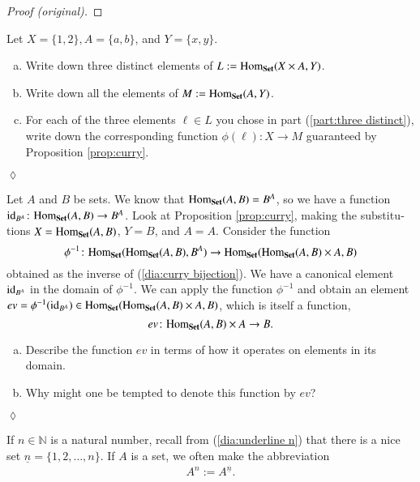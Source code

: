 \documentclass{book}
\def\tn{\textnormal}
\def\NN{{\mathbb N}}
\def\Hom{\tn{Hom}}
\def\to{\rightarrow}
\def\taking{\colon}
\def\m1{{-1}}
\def\ul{\underline}
\def\id{\tn{id}}
\def\Set{{\bf Set}}
\theoremstyle{theoremENG}
\theoremstyle{lemmaENG}
\theoremstyle{propositionENG}
\theoremstyle{corollaryENG}
\theoremstyle{factENG}
\theoremstyle{remarkENG}
\theoremstyle{exampleENG}
\theoremstyle{warningENG}
\theoremstyle{questionENG}
\theoremstyle{guessENG}
\theoremstyle{answerENG}
\theoremstyle{constructionENG}
\theoremstyle{rulesENG}
\theoremstyle{excENG}
\newtheorem{excENG}[subsubsection]{\begin{english}Exercise\end{english}}
\theoremstyle{appENG}
\theoremstyle{definitionENG}
\theoremstyle{notationENG}
\theoremstyle{conjectureENG}
\theoremstyle{postulateENG}
\newenvironment{proofENG}{\begin{proof}[Proof (original)]}{\end{proof}}
\newenvironment{exerciseENG}{\begin{excENG}}{\hspace*{\fill}$\lozenge$\end{excENG}}
\theoremstyle{theoremRUS}
\theoremstyle{lemmaRUS}
\theoremstyle{propositionRUS}
\theoremstyle{corollaryRUS}
\theoremstyle{factRUS}
\theoremstyle{remarkRUS}
\theoremstyle{exampleRUS}
\theoremstyle{warningRUS}
\theoremstyle{questionRUS}
\theoremstyle{guessRUS}
\theoremstyle{answerRUS}
\theoremstyle{constructionRUS}
\theoremstyle{rulesRUS}
\theoremstyle{excRUS}
\theoremstyle{appRUS}
\theoremstyle{definitionRUS}
\theoremstyle{notationRUS}
\theoremstyle{conjectureRUS}
\theoremstyle{postulateRUS}
\def\sexc{\begin{enumerate}[a.)]\setlength{\itemsep}{.1cm}\setlength{\parskip}{.1cm}\item}
\def\next{\item}
\def\endsexc{\end{enumerate}}
\begin{document}
\begin{english}
\begin{proofENG}
\end{proofENG}

\begin{exerciseENG}

Let $X=\{1,2\}, A=\{a,b\}$, and $Y=\{x,y\}$. 
\sexc\label{part:three distinct} Write down three distinct elements of $L:=\Hom_\Set(X\times A,Y)$. 
\next Write down all the elements of $M:=\Hom_\Set(A,Y)$. 
\next For each of the three elements $\ell\in L$ you chose in part (\ref{part:three distinct}), write down the corresponding function $\phi(\ell)\taking X\to M$ guaranteed by Proposition \ref{prop:curry}.
\endsexc

\begin{russian} \end{russian}

\end{exerciseENG}

\begin{exerciseENG}\label{exc:evaluation}

Let $A$ and $B$ be sets. We know that $\Hom_\Set(A,B)=B^A$, so we have a function $\id_{B^A}\taking\Hom_\Set(A,B)\to B^A$. Look at Proposition \ref{prop:curry}, making the substitutions $X=\Hom_\Set(A,B)$, $Y=B$, and  $A=A$. Consider the function $$\phi^\m1\taking\Hom_\Set(\Hom_\Set(A,B),B^A)\to\Hom_\Set(\Hom_\Set(A,B)\times A,B)$$ obtained as the inverse of (\ref{dia:curry bijection}). We have a canonical element $\id_{B^A}$ in the domain of $\phi^\m1$. We can apply the function $\phi^\m1$ and obtain an element $ev=\phi^\m1(\id_{B^A})\in\Hom_\Set(\Hom_\Set(A,B)\times A,B)$, which is itself a function, $$ev\taking\Hom_\Set(A,B)\times A\to B.$$ 
\sexc Describe the function $ev$ in terms of how it operates on elements in its domain. 
\next Why might one be tempted to denote this function by $ev$?
\endsexc

\begin{russian} \end{russian}

\end{exerciseENG}

If $n\in\NN$ is a natural number, recall from (\ref{dia:underline n}) that there is a nice set $\ul{n}=\{1,2,\ldots,n\}$. If $A$ is a set, we often make the abbreviation 
\begin{align}\label{dia:exponential abbrev}
A^n:=A^{\ul{n}}.
\end{align}

\begin{russian} \end{russian}


\end{english}
\end{document}
